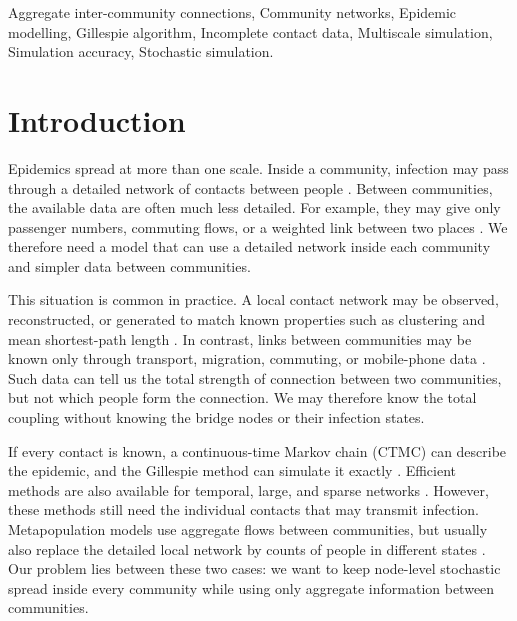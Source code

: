\documentclass{ieeeaccess}
\begin{document}
\begin{keywords}
Aggregate inter-community connections, Community networks, Epidemic modelling, Gillespie algorithm, Incomplete contact data, Multiscale simulation, Simulation accuracy, Stochastic simulation.
\end{keywords}
\titlepgskip=-21pt
\maketitle

\section{Introduction}
\label{sec:introduction}

Epidemics spread at more than one scale. Inside a community, infection may pass through a detailed network of contacts between people \cite{keeling2005,pastorsatorras2015,kiss2017}. Between communities, the available data are often much less detailed. For example, they may give only passenger numbers, commuting flows, or a weighted link between two places \cite{balcan2009,barbosa2018human}. We therefore need a model that can use a detailed network inside each community and simpler data between communities.

This situation is common in practice. A local contact network may be observed, reconstructed, or generated to match known properties such as clustering and mean shortest-path length \cite{eubank2004,danon2011}. In contrast, links between communities may be known only through transport, migration, commuting, or mobile-phone data \cite{barbosa2018human,chang2021}. Such data can tell us the total strength of connection between two communities, but not which people form the connection. We may therefore know the total coupling without knowing the bridge nodes or their infection states.

If every contact is known, a continuous-time Markov chain (CTMC) can describe the epidemic, and the Gillespie method can simulate it exactly \cite{gillespie1977exact,gibson2000}. Efficient methods are also available for temporal, large, and sparse networks \cite{vestergaard2015,kuryliak2025simulating}. However, these methods still need the individual contacts that may transmit infection. Metapopulation models use aggregate flows between communities, but usually also replace the detailed local network by counts of people in different states \cite{colizza2007reaction,colizza2008,balcan2010modeling,ajelli2010}. Our problem lies between these two cases: we want to keep node-level stochastic spread inside every community while using only aggregate information between communities.
\end{document}
